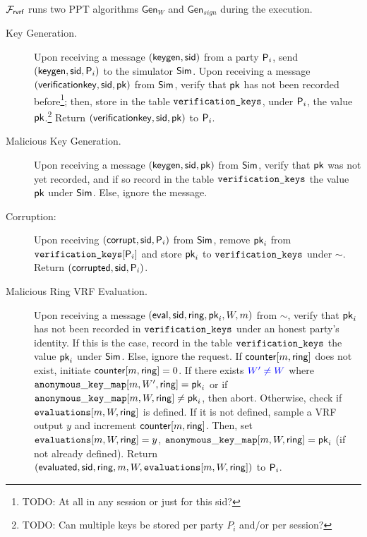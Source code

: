 


\newcommand{\Gen}{\ensuremath{\mathsf{Gen}}}

\newcommand{\counter}{\ensuremath{\mathsf{counter}}\xspace}
\newcommand{\anonymouskeymap}{\ensuremath{\mathtt{anonymous\_key\_map}}\xspace}



\begin{tcolorbox}[colback=white]
{ \scriptsize
$ \mathcal{F}_{\textsf{rvrf}} $ runs two PPT algorithms $ \Gen_W$ and $\Gen_{sign} $ during the execution.

\begin{description}
	\item[Key Generation.] Upon receiving a message $(\mathsf{keygen}, \textsf{sid})$ from a party $\mathsf{P}_i$, send $(\mathsf{keygen}, \textsf{sid}, \mathsf{P}_i)$ to the simulator $\mathsf{Sim}$.
	Upon receiving a message $(\mathsf{verificationkey}, \textsf{sid}, \mathsf{pk})$ from $\mathsf{Sim}$, verify that $\mathsf{pk}$ has not been recorded before\footnote{{ \color{blue} TODO: At all in any session or just for this sid?}}; then, store in the table $\texttt{verification\_keys}$, under $\mathsf{P}_i$, the value $\mathsf{pk}$.\footnote{{ \color{blue} TODO: Can multiple keys be stored per party $P_i$ and/or per session?}}
	Return $(\mathsf{verificationkey}, \textsf{sid}, \mathsf{pk})$ to $ \mathsf{P}_i$.

	\item[Malicious Key Generation.] Upon receiving a message $(\mathsf{keygen}, \textsf{sid}, \mathsf{pk})$ from $\mathsf{Sim}$, verify that $\mathsf{pk}$ was not yet recorded, and if so record in the table $\texttt{verification\_keys}$ the value $\mathsf{pk}$ under $\mathsf{Sim}$. Else, ignore the message.
	
	\item [Corruption:]  Upon receiving $ (\mathsf{corrupt}, \textsf{sid}, \mathsf{P}_i) $ from $ \mathsf{Sim} $, remove $ \mathsf{pk}_i $ from $ \texttt{verification\_keys}[\mathsf{P}_i] $ and store $ \mathsf{pk}_i $ to $ \texttt{verification\_keys} $ under $ \sim $. Return $ (\mathsf{corrupted}, \textsf{sid},\mathsf{P}_i) $.
	\item[Malicious Ring VRF Evaluation.] Upon receiving a message $(\mathsf{eval}, \textsf{sid}, \mathsf{ring}, \mathsf{pk}_i, W, m)$ from $\sim$, verify that $ \mathsf{pk}_i $ has not been recorded in $\texttt{verification\_keys}$ under an honest party's identity.
	If this is the case, record in the table $\texttt{verification\_keys}$ the value $\mathsf{pk}_i$ under $\mathsf{Sim}$. Else, ignore the request.  If $ \counter[m,\ringset] $ does not exist, initiate $ \counter[m,\ringset] = 0 $. If there exists ${\color{blue} W' \neq W }$ where 
	{\color{blue} $\anonymouskeymap[m,W',\ringset] = \pk_i$ or if $\anonymouskeymap[m,W,\ringset] \neq \pk_i$}, then abort. 
	Otherwise, check if $ \texttt{evaluations}[m,W,\mathsf{ring}] $ is defined. If it is not defined, sample a VRF output $y$ and increment $ \counter[m,\ringset] $. Then, set $ \texttt{evaluations}[m, W, \mathsf{ring}] = y$, $ \anonymouskeymap[m,W,\ringset] = \pk_i $ (if not already defined).
	Return $(\mathsf{evaluated}, \textsf{sid}, \mathsf{ring}, m, W, \texttt{evaluations}[m, W, \mathsf{ring}])$ to $ \mathsf{P}_i $.
	

\end{description}}
\end{tcolorbox}
